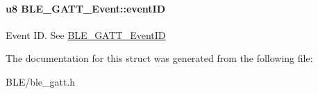 \paragraph[{\texorpdfstring{event\+ID}{eventID}}]{\setlength{\rightskip}{0pt plus 5cm}u8 B\+L\+E\+\_\+\+G\+A\+T\+T\+\_\+\+Event\+::event\+ID}\hypertarget{struct_b_l_e___g_a_t_t___event_a0608480c5fb5b2e11d65fc80191a2dad}{}\label{struct_b_l_e___g_a_t_t___event_a0608480c5fb5b2e11d65fc80191a2dad}
Event ID. See \hyperlink{group___b_l_e___g_a_t_t_ga0a64d101980333994dbe7959f99d6b33}{B\+L\+E\+\_\+\+G\+A\+T\+T\+\_\+\+Event\+ID} 

The documentation for this struct was generated from the following file\+:\begin{DoxyCompactItemize}
\item 
B\+L\+E/ble\+\_\+gatt.\+h\end{DoxyCompactItemize}

